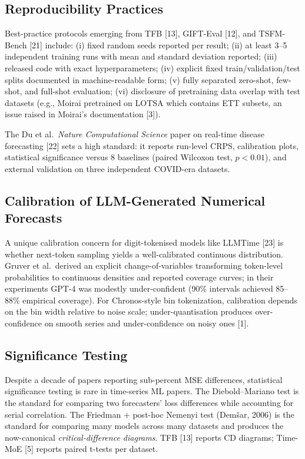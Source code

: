 \subsection{Reproducibility Practices}\label{reproducibility-practices}

Best-practice protocols emerging from TFB {[}13{]}, GIFT-Eval {[}12{]}, and TSFM-Bench {[}21{]} include: (i) fixed random seeds reported per result; (ii) at least 3--5 independent training runs with mean and standard deviation reported; (iii) released code with exact hyperparameters; (iv) explicit fixed train/validation/test splits documented in machine-readable form; (v) fully separated zero-shot, few-shot, and full-shot evaluation; (vi) disclosure of pretraining data overlap with test datasets (e.g., Moirai pretrained on LOTSA which contains ETT subsets, an issue raised in Moirai's documentation {[}3{]}).

The Du et al.~\emph{Nature Computational Science} paper on real-time disease forecasting {[}22{]} sets a high standard: it reports run-level CRPS, calibration plots, statistical significance versus 8 baselines (paired Wilcoxon test, \(p < 0.01\)), and external validation on three independent COVID-era datasets.

\subsection{Calibration of LLM-Generated Numerical Forecasts}\label{calibration-of-llm-generated-numerical-forecasts}

A unique calibration concern for digit-tokenised models like LLMTime {[}23{]} is whether next-token sampling yields a well-calibrated continuous distribution. Gruver et al.~derived an explicit change-of-variables transforming token-level probabilities to continuous densities and reported coverage curves; in their experiments GPT-4 was modestly under-confident (90\% intervals achieved 85--88\% empirical coverage). For Chronos-style bin tokenization, calibration depends on the bin width relative to noise scale; under-quantisation produces over-confidence on smooth series and under-confidence on noisy ones {[}1{]}.

\subsection{Significance Testing}\label{significance-testing}

Despite a decade of papers reporting sub-percent MSE differences, statistical significance testing is rare in time-series ML papers. The Diebold--Mariano test is the standard for comparing two forecasters' loss differences while accounting for serial correlation. The Friedman + post-hoc Nemenyi test (Demšar, 2006) is the standard for comparing many models across many datasets and produces the now-canonical \emph{critical-difference diagrams}. TFB {[}13{]} reports CD diagrams; Time-MoE {[}5{]} reports paired t-tests per dataset.

